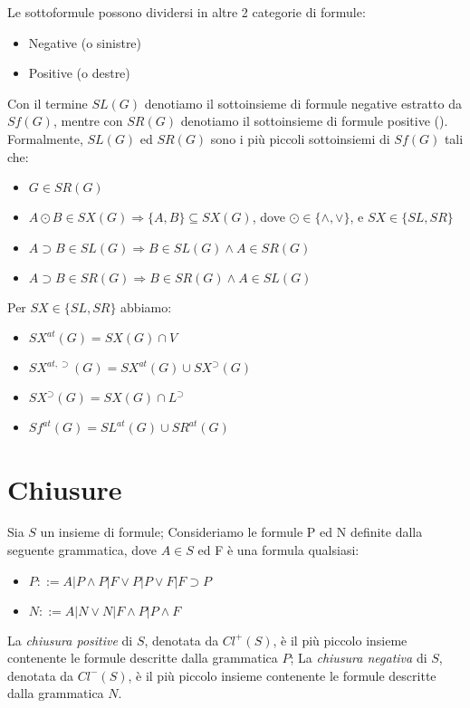 \documentclass[\main/tesi.tex]{subfiles}
\begin{document}
Le sottoformule possono dividersi in altre 2 categorie di formule:
\begin{itemize}
    \item Negative (o sinistre)
    \item Positive (o destre)
\end{itemize}

Con il termine $SL(G)$ denotiamo il sottoinsieme di formule negative estratto da $Sf(G)$, mentre con $SR(G)$ denotiamo il sottoinsieme di formule positive (\cite{TroSch:00}). \\
Formalmente, $SL(G)$ ed $SR(G)$ sono i più piccoli sottoinsiemi di $Sf(G)$ tali che:
\begin{itemize}
    \item $G \in SR(G)$
    \item $A \odot B \in SX(G) \Rightarrow \{A, B\} \subseteq SX(G)$, dove $\odot \in \{\land, \lor\}$, e $SX \in \{SL, SR\}$
    \item $A \supset B \in SL(G) \Rightarrow B \in SL(G) \land A \in SR(G)$
    \item $A \supset B \in SR(G) \Rightarrow B \in SR(G) \land A \in SL(G)$
\end{itemize}

Per $SX \in \{SL, SR\}$ abbiamo:
\begin{itemize}
    \item $SX^{at}(G) = SX(G) \cap V$
    \item $SX^{at, \supset}(G) = SX^{at}(G) \cup SX^{\supset}(G)$
    \item $SX^{\supset}(G) = SX(G) \cap L^{\supset}$
    \item $Sf^{at}(G) = SL^{at}(G) \cup SR^{at}(G)$
\end{itemize}

\newpage

\section{Chiusure}

Sia $S$ un insieme di formule; Consideriamo le formule P ed N definite dalla seguente grammatica, dove $A \in S$ ed F è una formula qualsiasi:
\begin{itemize}
    \item $P ::= A|P \land P|F \lor P|P \lor F|F \supset P$
    \item $N ::= A|N \lor N|F \land P|P \land F$
\end{itemize}
La \textit{chiusura positive} di $S$, denotata da $Cl^+(S)$, è il più piccolo insieme contenente le formule descritte dalla grammatica $P$;
La \textit{chiusura negativa} di $S$, denotata da $Cl^-(S)$, è il più piccolo insieme contenente le formule descritte dalla grammatica $N$. \\
\end{document}
